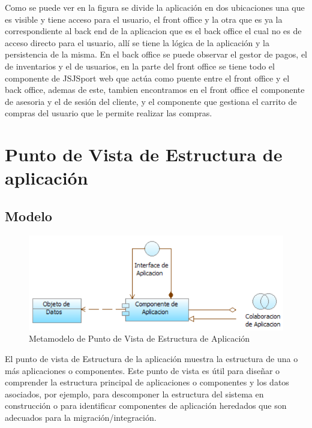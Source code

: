 Como se puede ver en la figura se divide la aplicación en dos ubicaciones una que es visible y tiene acceso para el usuario, el front office y la otra que es ya la correspondiente al back end de la aplicacion que es el back office el cual no es de acceso directo para el usuario, allí se tiene la lógica de la aplicación y la persistencia de la misma.
\newline
En el back office se puede observar el gestor de pagos, el de inventarios y el de usuarios, en la parte del front office se tiene todo el componente de JSJSport web que actúa como puente entre el front office y el back office, ademas de este, tambien encontramos en el front office el componente de asesoria y el de sesión del cliente, y el componente que gestiona el carrito de compras del usuario que le permite realizar las compras.

\newpage

\section{Punto de Vista de Estructura de aplicación}

\subsection{Modelo}

\begin{figure}[th!]
	\centering
	\includegraphics[width=0.7\linewidth]{arquitectura/imagenes/modeloEstructuraAplicacion}
	\caption{Metamodelo de Punto de Vista de Estructura de Aplicación \cite{pun9}}
	\label{fig:metamodelo de punto de vista de estructura de aplicación}
\end{figure}
El punto de vista de Estructura de la aplicación muestra la estructura de una o más aplicaciones o componentes. Este punto de vista es útil para diseñar o comprender la estructura principal de aplicaciones o componentes y los datos asociados, por ejemplo, para descomponer la estructura del sistema en construcción o para identificar componentes de aplicación heredados que son adecuados para la migración/integración.

